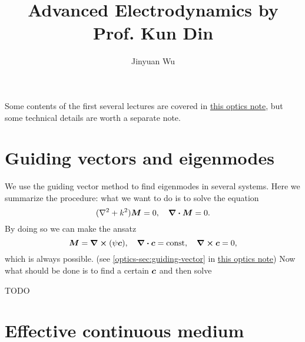 \documentclass[hyperref, a4paper]{article}
\title{Advanced Electrodynamics by Prof. Kun Din}
\author{Jinyuan Wu}
\newcommand*{\const}{\mathrm{const}}
\newcommand{\opticsdoc}{\href{../optics/optics.pdf}{this optics note}}
\begin{document}
\maketitle

Some contents of the first several lectures are covered in \opticsdoc,
but some technical details are worth a separate note.

\section{Guiding vectors and eigenmodes}

We use the guiding vector method to find eigenmodes in 
several systems. Here we summarize the procedure: what we want to do is to solve the equation 
\begin{equation}
    (\laplacian + k^2) \vb*{M} = 0, \quad \div{\vb*{M}} = 0.
\end{equation}
By doing so we can make the ansatz 
\begin{equation}
    \vb*{M} = \curl(\psi \vb*{c}), \quad \div{\vb*{c}} = \const, \quad \curl{\vb*{c}} = 0, 
\end{equation}
which is always possible. (see \eqref{optics-sec:guiding-vector} in \opticsdoc) Now what should be done is 
to find a certain $\vb*{c}$ and then solve 

TODO



\section{Effective continuous medium}
\end{document}
